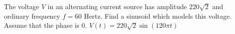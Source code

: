 { The voltage $V$ in an alternating current source has amplitude $220 \sqrt{2}$ and ordinary frequency $f = 60$ Hertz.  Find a sinusoid which models this voltage.  Assume that the phase is $0$.}
{$V(t) = 220 \sqrt{2} \sin\left(120\pi t\right)$}
